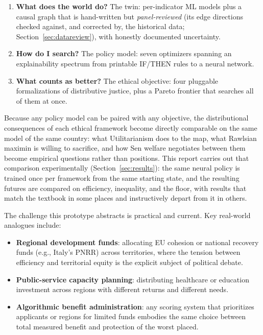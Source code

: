 \documentclass[11pt,a4paper]{article}
\begin{document}
\begin{enumerate}
    \item \textbf{What does the world do?} The twin: per-indicator ML models
    plus a causal graph that is hand-written but \emph{panel-reviewed} (its edge
    directions checked against, and corrected by, the historical data;
    Section~\ref{sec:datareview}), with honestly documented uncertainty.
    \item \textbf{How do I search?} The policy model: seven optimizers
    spanning an explainability spectrum from printable IF/THEN rules to a neural
    network.
    \item \textbf{What counts as better?} The ethical objective: four
    pluggable formalizations of distributive justice, plus a Pareto frontier
    that searches all of them at once.
\end{enumerate}

Because any policy model can be paired with any objective, the distributional
consequences of each ethical framework become directly comparable on the same
model of the same country: what Utilitarianism does to the map, what Rawlsian
maximin is willing to sacrifice, and how Sen welfare negotiates between them
become empirical questions rather than positions. This report carries out
that comparison experimentally (Section~\ref{sec:results}): the same neural
policy is trained once per framework from the same starting state, and the
resulting futures are compared on efficiency, inequality, and the floor,
with results that match the textbook in some places and instructively depart
from it in others.

The challenge this prototype abstracts is practical and current. Key real-world
analogues include:

\begin{itemize}
    \item \textbf{Regional development funds}: allocating EU cohesion or
    national recovery funds (e.g., Italy's PNRR) across territories, where the
    tension between efficiency and territorial equity is the explicit subject of
    political debate.
    \item \textbf{Public-service capacity planning}: distributing healthcare or
    education investment across regions with different returns and different
    needs.
    \item \textbf{Algorithmic benefit administration}: any scoring system that
    prioritizes applicants or regions for limited funds embodies the same
    choice between total measured benefit and protection of the worst placed.
\end{itemize}
\end{document}
